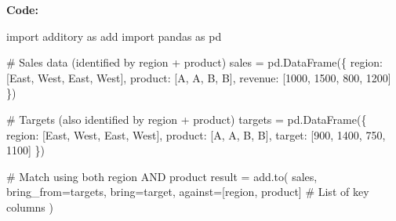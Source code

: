 \documentclass[
  letterpaper,
]{scrbook}
\newenvironment{Shaded}{\begin{snugshade}}{\end{snugshade}}
\newcommand{\CommentTok}[1]{\textcolor[rgb]{0.37,0.37,0.37}{#1}}
\newcommand{\DecValTok}[1]{\textcolor[rgb]{0.68,0.00,0.00}{#1}}
\newcommand{\ImportTok}[1]{\textcolor[rgb]{0.00,0.46,0.62}{#1}}
\newcommand{\NormalTok}[1]{\textcolor[rgb]{0.00,0.23,0.31}{#1}}
\newcommand{\OperatorTok}[1]{\textcolor[rgb]{0.37,0.37,0.37}{#1}}
\newcommand{\StringTok}[1]{\textcolor[rgb]{0.13,0.47,0.30}{#1}}
\begin{document}
\textbf{Code:}

\begin{Shaded}
\begin{Highlighting}[]
\ImportTok{import}\NormalTok{ additory }\ImportTok{as}\NormalTok{ add}
\ImportTok{import}\NormalTok{ pandas }\ImportTok{as}\NormalTok{ pd}

\CommentTok{\# Sales data (identified by region + product)}
\NormalTok{sales }\OperatorTok{=}\NormalTok{ pd.DataFrame(\{}
    \StringTok{\textquotesingle{}region\textquotesingle{}}\NormalTok{: [}\StringTok{\textquotesingle{}East\textquotesingle{}}\NormalTok{, }\StringTok{\textquotesingle{}West\textquotesingle{}}\NormalTok{, }\StringTok{\textquotesingle{}East\textquotesingle{}}\NormalTok{, }\StringTok{\textquotesingle{}West\textquotesingle{}}\NormalTok{],}
    \StringTok{\textquotesingle{}product\textquotesingle{}}\NormalTok{: [}\StringTok{\textquotesingle{}A\textquotesingle{}}\NormalTok{, }\StringTok{\textquotesingle{}A\textquotesingle{}}\NormalTok{, }\StringTok{\textquotesingle{}B\textquotesingle{}}\NormalTok{, }\StringTok{\textquotesingle{}B\textquotesingle{}}\NormalTok{],}
    \StringTok{\textquotesingle{}revenue\textquotesingle{}}\NormalTok{: [}\DecValTok{1000}\NormalTok{, }\DecValTok{1500}\NormalTok{, }\DecValTok{800}\NormalTok{, }\DecValTok{1200}\NormalTok{]}
\NormalTok{\})}

\CommentTok{\# Targets (also identified by region + product)}
\NormalTok{targets }\OperatorTok{=}\NormalTok{ pd.DataFrame(\{}
    \StringTok{\textquotesingle{}region\textquotesingle{}}\NormalTok{: [}\StringTok{\textquotesingle{}East\textquotesingle{}}\NormalTok{, }\StringTok{\textquotesingle{}West\textquotesingle{}}\NormalTok{, }\StringTok{\textquotesingle{}East\textquotesingle{}}\NormalTok{, }\StringTok{\textquotesingle{}West\textquotesingle{}}\NormalTok{],}
    \StringTok{\textquotesingle{}product\textquotesingle{}}\NormalTok{: [}\StringTok{\textquotesingle{}A\textquotesingle{}}\NormalTok{, }\StringTok{\textquotesingle{}A\textquotesingle{}}\NormalTok{, }\StringTok{\textquotesingle{}B\textquotesingle{}}\NormalTok{, }\StringTok{\textquotesingle{}B\textquotesingle{}}\NormalTok{],}
    \StringTok{\textquotesingle{}target\textquotesingle{}}\NormalTok{: [}\DecValTok{900}\NormalTok{, }\DecValTok{1400}\NormalTok{, }\DecValTok{750}\NormalTok{, }\DecValTok{1100}\NormalTok{]}
\NormalTok{\})}

\CommentTok{\# Match using both region AND product}
\NormalTok{result }\OperatorTok{=}\NormalTok{ add.to(}
\NormalTok{    sales,}
\NormalTok{    bring\_from}\OperatorTok{=}\NormalTok{targets,}
\NormalTok{    bring}\OperatorTok{=}\StringTok{\textquotesingle{}target\textquotesingle{}}\NormalTok{,}
\NormalTok{    against}\OperatorTok{=}\NormalTok{[}\StringTok{\textquotesingle{}region\textquotesingle{}}\NormalTok{, }\StringTok{\textquotesingle{}product\textquotesingle{}}\NormalTok{]    }\CommentTok{\# List of key columns}
\NormalTok{)}


\end{Highlighting}
\end{Shaded}
\end{document}
